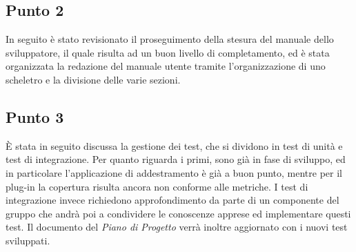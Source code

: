     \subsection{Punto 2}
        In seguito è stato revisionato il proseguimento della stesura del manuale dello sviluppatore, il quale risulta ad un buon livello di completamento, ed è stata organizzata la redazione del manuale utente tramite l'organizzazione di uno scheletro e la divisione delle varie sezioni.
    \subsection{Punto 3}
        È stata in seguito discussa la gestione dei test, che si dividono in test di unità e test di integrazione. Per quanto riguarda i primi, sono già in fase di sviluppo, ed in particolare l'applicazione di addestramento è già a buon punto, mentre per il plug-in la copertura risulta ancora non conforme alle metriche\glo. I test di integrazione invece richiedono approfondimento da parte di un componente del gruppo che andrà poi a condividere le conoscenze apprese ed implementare questi test. Il documento del \textit{Piano di Progetto} verrà inoltre aggiornato con i nuovi test sviluppati.
